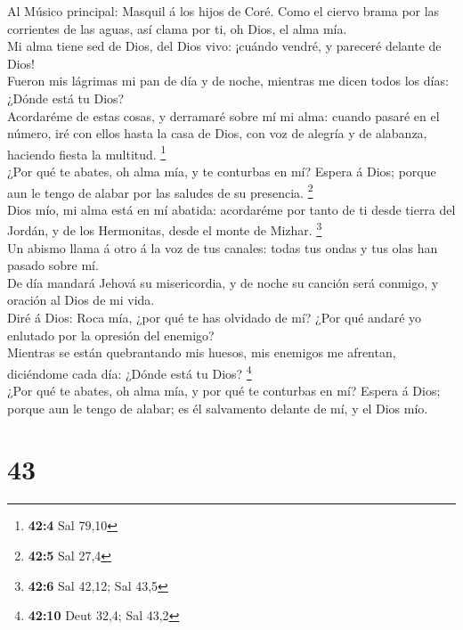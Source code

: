  Al Músico principal: Masquil á los hijos de Coré. Como el
ciervo brama por las corrientes de las aguas, así clama por ti, oh Dios,
el alma mía.\\
 Mi alma tiene sed de Dios, del Dios vivo: ¡cuándo vendré,
y pareceré delante de Dios!\\
 Fueron mis lágrimas mi pan de día y de noche, mientras me
dicen todos los días: ¿Dónde está tu Dios?\\
 Acordaréme de estas cosas, y derramaré sobre mí mi alma:
cuando pasaré en el número, iré con ellos hasta la casa de Dios, con voz
de alegría y de alabanza, haciendo fiesta la multitud. \footnote{\textbf{42:4}
  Sal 79,10}\\
 ¿Por qué te abates, oh alma mía, y te conturbas en mí?
Espera á Dios; porque aun le tengo de alabar por las saludes de su
presencia. \footnote{\textbf{42:5} Sal 27,4}\\
 Dios mío, mi alma está en mí abatida: acordaréme por
tanto de ti desde tierra del Jordán, y de los Hermonitas, desde el monte
de Mizhar. \footnote{\textbf{42:6} Sal 42,12; Sal 43,5}\\
 Un abismo llama á otro á la voz de tus canales: todas tus
ondas y tus olas han pasado sobre mí.\\
 De día mandará Jehová su misericordia, y de noche su
canción será conmigo, y oración al Dios de mi vida.\\
 Diré á Dios: Roca mía, ¿por qué te has olvidado de mí?
¿Por qué andaré yo enlutado por la opresión del enemigo?\\
 Mientras se están quebrantando mis huesos, mis enemigos
me afrentan, diciéndome cada día: ¿Dónde está tu Dios? \footnote{\textbf{42:10}
  Deut 32,4; Sal 43,2}\\
 ¿Por qué te abates, oh alma mía, y por qué te conturbas
en mí? Espera á Dios; porque aun le tengo de alabar; es él salvamento
delante de mí, y el Dios mío.

\hypertarget{section-42}{%
\section{43}\label{section-42}}

